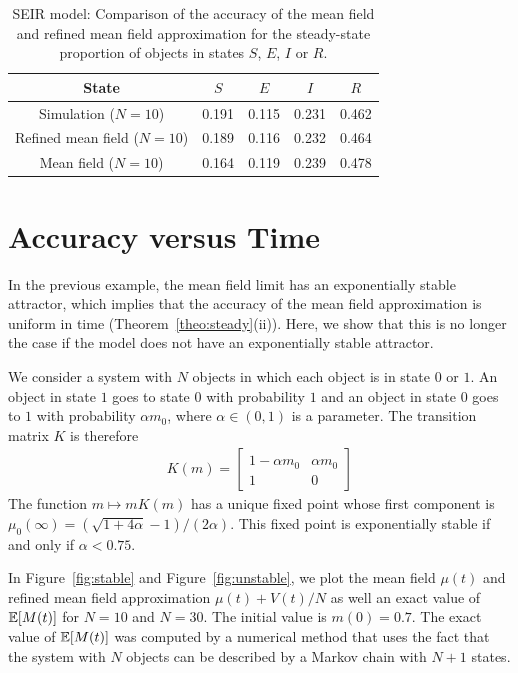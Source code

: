 \documentclass{sig-alternate-per}
\newcommand\esp[1]{{\mathchoice{\besp{#1}}{\sesp{#1}}{\sesp{#1}}{\sesp{#1}}}}
\newcommand\besp[1]{\mathbb{E}\left[#1\right]}
\newcommand\sesp[1]{\mathbb{E}[#1]}
\begin{document}
 \begin{table}[ht]
\begin{center}
\begin{tabular}{@{}|@{~}c@{~}|c|c|c|c|}\hline
State                                & $S$ & $E$ & $I$ & $R$ \\\hline
Simulation ($N=10$)            & 0.191 & 0.115 & 0.231 &0.462 \\ \hline
Refined mean field ($N=10$) & 0.189& 0.116 & 0.232& 0.464\\ \hline
Mean field ($N=10$)               & 0.164 & 0.119 & 0.239 & 0.478\\ \hline
\end{tabular}
\end{center}
\caption{\label{tbl:steadySEIR} SEIR model: Comparison of the accuracy
  of the mean field and refined mean field approximation for the
  steady-state proportion of objects in states $S$, $E$, $I$ or $R$. }
\end{table}
   

\section{Accuracy versus Time}

In the previous example, the mean field limit has an exponentially
stable attractor, which implies that the accuracy of the mean field
approximation is uniform in time (Theorem~\ref{theo:steady}(ii)).
Here, we show that this is no longer the case if the model does not
have an exponentially stable attractor.

We consider a system with $N$ objects in which each object is in state
$0$ or $1$. An object in state $1$ goes to state $0$ with probability
$1$ and an object in state $0$ goes to $1$ with probability
$\alpha m_0$, where $\alpha\in(0,1)$ is a parameter. The transition
matrix $K$ is therefore
\begin{align*}
  K(m) = \left[
  \begin{array}{cc}
    1-\alpha m_0&\alpha m_0\\
    1 & 0
  \end{array}
\right]
\end{align*}
The function $m\mapsto mK(m)$ has a unique fixed point whose first
component is $\mu_0(\infty)=(\sqrt{1+4\alpha}-1)/(2\alpha)$. This
fixed point is exponentially stable if and only if $\alpha < 0.75$.

In Figure~\ref{fig:stable} and Figure~\ref{fig:unstable}, we plot the
mean field $\mu(t)$ and refined mean field approximation
$\mu(t)+V(t)/N$ as well an exact value of $\esp{M(t)}$ for $N=10$ and
$N=30$. The initial value is $m(0)=0.7$. The exact value of
$\esp{M(t)}$ was computed by a numerical method that uses the fact
that the system with $N$ objects can be described by a Markov chain
with $N+1$ states.
\end{document}
